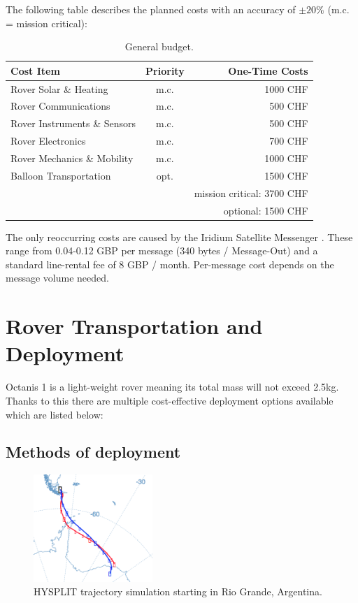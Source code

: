 \documentclass[a4paper,12pt]{article}
\begin{document}
The following table describes the planned costs with an accuracy of $\pm 20\%$ (m.c. = mission critical): \\ 

\begin{table}[h!]
\centering
\begin{tabular}{ l | c || r }
  Cost Item & Priority & One-Time Costs \\
  \hline
  Rover Solar \& Heating & m.c. & 1000 CHF \\
  Rover Communications & m.c. & 500 CHF \\
  Rover Instruments \& Sensors & m.c. & 500 CHF \\
  Rover Electronics & m.c. & 700 CHF \\
  Rover Mechanics \& Mobility & m.c. & 1000 CHF \\
  Balloon Transportation & opt. & 1500 CHF \\
  \hline \hline
  & & mission critical: 3700 CHF  \\
  & & optional: 1500 CHF \\
\end{tabular}
\caption{General budget.}
\end{table}


The only reoccurring costs are caused by the Iridium Satellite Messenger \cite{iridium}. These range from 0.04-0.12 GBP per message (340 bytes / Message-Out) and a standard line-rental fee of 8 GBP / month. Per-message cost depends on the message volume needed.



\section{Rover Transportation and Deployment}

Octanis 1 is a light-weight rover meaning its total mass will not exceed 2.5kg. Thanks to this there are multiple cost-effective deployment options available which are listed below:

\subsection{Methods of deployment}

\begin{figure}[h!]
	\centering
    \includegraphics[width=0.4\textwidth]{trajectory}
    \caption{HYSPLIT trajectory simulation starting in Rio Grande, Argentina.}
\end{figure}
\end{document}
